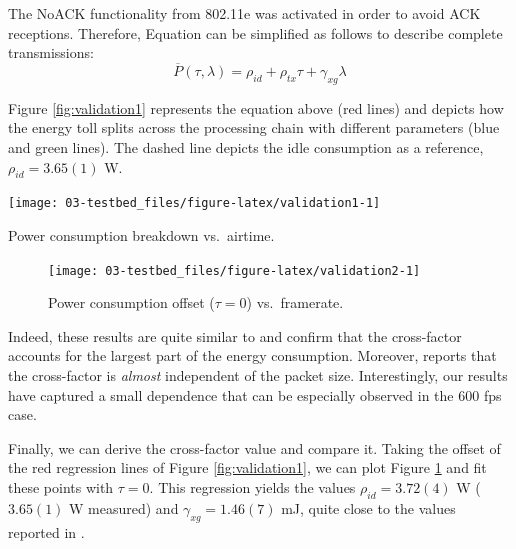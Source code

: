 \documentclass[twoside,nohyper]{tufte-book}
\makeatletter
\let\orig@maketag@@@\maketag@@@
\renewcommand{\eqref}[1]{\textup{\let\maketag@@@\orig@maketag@@@\tagform@{\ref{#1}}}}
\def\maketag@@@#1{\hbox{\rlap{\kern\marginparsep\m@th\normalfont#1}\kern1sp}}
\theoremstyle{definition}
\theoremstyle{definition}
\theoremstyle{definition}
\theoremstyle{remark}
\makeatother
\begin{document}
The NoACK functionality from 802.11e was activated in order to avoid ACK
receptions. Therefore, Equation \eqref{eq:new-energy-model} can be
simplified as follows to describe complete transmissions:
%
\begin{equation*}
 \overline{P}(\tau, \lambda) = \rho_{id} + \rho_{tx}\tau + \gamma_{xg}\lambda
 \label{eq:validation1}
\end{equation*}
%

Figure \ref{fig:validation1} represents the equation above (red lines)
and depicts how the energy toll splits across the processing chain with
different parameters (blue and green lines). The dashed line depicts the
idle consumption as a reference, \(\rho_{id}=3.65(1)\) W.





\begin{marginfigure}[-3.5in]

{\centering \texttt{[image: 03-testbed\_files/figure-latex/validation1-1]} 

}

\caption[Power consumption breakdown vs.~airtime.]{Power consumption breakdown vs.~airtime.}\label{fig:validation1}
\end{marginfigure}

\begin{figure}[b]

{\centering \texttt{[image: 03-testbed\_files/figure-latex/validation2-1]} 

}

\caption[Power consumption offset (\(\tau=0\)) vs.~framerate.]{Power consumption offset (\(\tau=0\)) vs.~framerate.}\label{fig:validation2}
\end{figure}

Indeed, these results are quite similar to \citet{Serrano2014} and
confirm that the cross-factor accounts for the largest part of the
energy consumption. Moreover, \citet{Serrano2014} reports that the
cross-factor is \emph{almost} independent of the packet size.
Interestingly, our results have captured a small dependence that can be
especially observed in the 600 fps case.

Finally, we can derive the cross-factor value and compare it. Taking the
offset of the red regression lines of Figure \ref{fig:validation1}, we
can plot Figure \ref{fig:validation2} and fit these points with
\(\tau=0\). This regression yields the values \(\rho_{id}=3.72(4)\) W
(\(3.65(1)\) W measured) and \(\gamma_{xg}=1.46(7)\) mJ, quite close to
the values reported in \citet{Serrano2014}.
\end{document}
